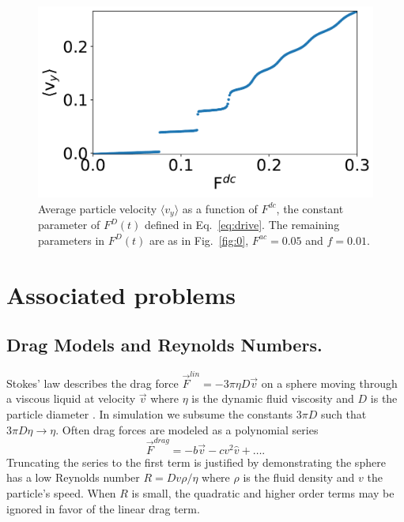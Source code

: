 \documentclass[twocolumn,preprintnumbers,amsmath,amssymb,aps,prx]{revtex4}
\begin{document}
\begin{center}
\begin{figure}[h!]
\centering
\includegraphics[width=\columnwidth]{sweep_FDC_vs_vx.pdf}
\caption{Average particle velocity  $\langle v_{y} \rangle$ as a function of $F^{dc}$,
  the constant parameter of $F^D(t)$ defined in Eq.~\ref{eq:drive}.
  The remaining parameters in $F^D(t)$ are as in Fig.~\ref{fig:0}, $F^{ac}=0.05$ and $f = 0.01$.  }
\label{fig:1}
\end{figure}
\end{center}


\section{Associated problems}
\label{sec:problems}	%

\subsection{Drag Models and Reynolds Numbers.}
Stokes' law describes the drag force
$\vec{F}^{lin} = -3 \pi \eta D \vec{v}$ 
on a sphere
moving through a viscous liquid at velocity $\vec{v}$ 
  where $\eta$ is the dynamic fluid viscosity and 
  $D$ is the particle diameter \cite{Taylor2005}.
  In simulation we
  subsume the constants $3 \pi D$
  such that $3 \pi D \eta \rightarrow \eta $.
  Often drag forces are
  modeled as a polynomial series ~\cite{Taylor2005}
  \begin{equation}
    \vec{F}^{drag} = -b \vec{v} - c v^2 \hat{v} + \ldots  .
  \end{equation}
  Truncating the series to the first term
  is justified by demonstrating the sphere
  has a low Reynolds number  
  $R = D v \rho / \eta$
  where $\rho$ is the fluid density and $v$ the particle's speed.
  When $R$ is small, the quadratic and higher order terms
  may be ignored in favor of the linear drag term.
\end{document}
